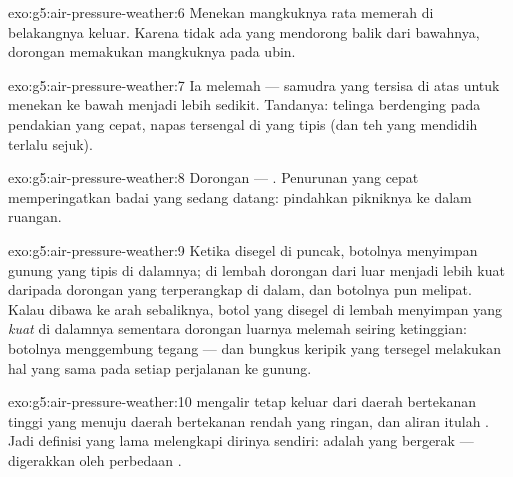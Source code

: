 \begin{solution}{exo:g5:air-pressure-weather:6}
Menekan mangkuknya rata memerah  di belakangnya keluar. Karena
tidak ada yang mendorong balik dari bawahnya, dorongan 
memakukan mangkuknya pada ubin.
\end{solution}

\begin{solution}{exo:g5:air-pressure-weather:7}
Ia melemah --- samudra  yang tersisa di atas untuk menekan ke
bawah menjadi lebih sedikit. Tandanya: telinga berdenging pada
pendakian yang cepat, napas tersengal di  yang tipis (dan teh
yang mendidih terlalu sejuk).
\end{solution}

\begin{solution}{exo:g5:air-pressure-weather:8}
Dorongan  --- . Penurunan yang cepat
memperingatkan badai yang sedang datang: pindahkan pikniknya ke dalam
ruangan.
\end{solution}

\begin{solution}{exo:g5:air-pressure-weather:9}
Ketika disegel di puncak, botolnya menyimpan  gunung yang tipis
di dalamnya; di lembah dorongan dari luar menjadi lebih kuat daripada
dorongan yang terperangkap di dalam, dan botolnya pun melipat. Kalau
dibawa ke arah sebaliknya, botol yang disegel di lembah menyimpan
 yang \emph{kuat} di dalamnya sementara dorongan luarnya melemah
seiring ketinggian: botolnya menggembung tegang --- dan bungkus keripik
yang tersegel melakukan hal yang sama pada setiap perjalanan ke gunung.
\end{solution}

\begin{solution}{exo:g5:air-pressure-weather:10}
 mengalir tetap keluar dari daerah bertekanan tinggi yang 
menuju daerah bertekanan rendah yang ringan, dan aliran itulah
. Jadi definisi yang lama melengkapi dirinya sendiri: 
adalah  yang bergerak --- digerakkan oleh perbedaan .
\end{solution}

